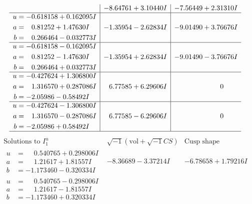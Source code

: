 \documentclass[1p]{elsarticle_modified}
\theoremstyle{definition}
\newcommand{\I}{\sqrt{-1}}
\begin{document}
$$\begin{array}{c|c|c}
 & -8.64761 + 3.10440 I & -7.56449 + 2.31310 I \\ \hline\begin{aligned}
u &= -0.618158 + 0.162095 I \\
a &= \phantom{-}0.81252 + 1.47630 I \\
b &= \phantom{-}0.266464 - 0.032773 I\end{aligned}
 & -1.35954 - 2.62834 I & -9.01490 + 3.76676 I \\ \hline\begin{aligned}
u &= -0.618158 - 0.162095 I \\
a &= \phantom{-}0.81252 - 1.47630 I \\
b &= \phantom{-}0.266464 + 0.032773 I\end{aligned}
 & -1.35954 + 2.62834 I & -9.01490 - 3.76676 I \\ \hline\begin{aligned}
u &= -0.427624 + 1.306800 I \\
a &= \phantom{-}1.316570 + 0.287086 I \\
b &= -2.05986 - 0.58492 I\end{aligned}
 & \phantom{-}6.77585 + 6.29606 I & \phantom{-0.000000 } 0 \\ \hline\begin{aligned}
u &= -0.427624 - 1.306800 I \\
a &= \phantom{-}1.316570 - 0.287086 I \\
b &= -2.05986 + 0.58492 I\end{aligned}
 & \phantom{-}6.77585 - 6.29606 I & \phantom{-0.000000 } 0\\
 \hline 
 \end{array}$$\newpage$$\begin{array}{c|c|c}  
\text{Solutions to }I^u_{1}& \I (\text{vol} + \sqrt{-1}CS) & \text{Cusp shape}\\
 \hline 
\begin{aligned}
u &= \phantom{-}0.540765 + 0.298006 I \\
a &= \phantom{-}1.21617 + 1.81557 I \\
b &= -1.173460 - 0.320334 I\end{aligned}
 & -8.36689 - 3.37214 I & -6.78658 + 1.79216 I \\ \hline\begin{aligned}
u &= \phantom{-}0.540765 - 0.298006 I \\
a &= \phantom{-}1.21617 - 1.81557 I \\
b &= -1.173460 + 0.320334 I\end{aligned}

\end{array}$$
\end{document}
